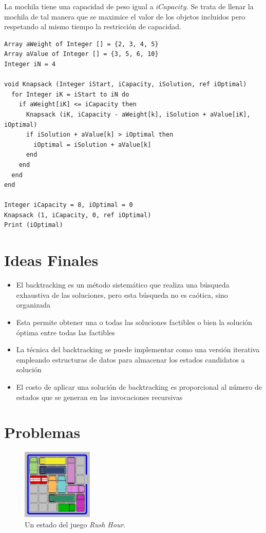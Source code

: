La mochila tiene una capacidad de peso igual a $iCapacity$. Se trata de llenar la mochila de tal manera que se maximice el valor de los objetos incluidos pero respetando al mismo tiempo la restricción de capacidad. 

\begin{lstlisting}[upquote=true, language=pseudo]
Array aWeight of Integer [] = {2, 3, 4, 5}
Array aValue of Integer [] = {3, 5, 6, 10}
Integer iN = 4

void Knapsack (Integer iStart, iCapacity, iSolution, ref iOptimal)
  for Integer iK = iStart to iN do
    if aWeight[iK] <= iCapacity then
      Knapsack (iK, iCapacity - aWeight[k], iSolution + aValue[iK], iOptimal)
      if iSolution + aValue[k] > iOptimal then
        iOptimal = iSolution + aValue[k]
      end
    end
  end
end

Integer iCapacity = 8, iOptimal = 0
Knapsack (1, iCapacity, 0, ref iOptimal)
Print (iOptimal)
\end{lstlisting}

\section{Ideas Finales}

\begin{itemize}
\item El backtracking es un método sistemático que realiza una búsqueda exhaustiva de las soluciones, pero esta búsqueda no es caótica, sino organizada
\item Esta permite obtener una o todas las soluciones factibles o bien la solución óptima entre todas las factibles
\item La técnica del backtracking se puede implementar como una versión iterativa empleando estructuras de datos para almacenar los estados candidatos a solución
\item El costo de aplicar una solución de backtracking es proporcional al número de estados que se generan en las invocaciones recursivas
\end{itemize}

\section{Problemas}
\begin{figure}[htp!]
  \begin{center}
    \includegraphics[width=0.3\textwidth]{images/rushhour.jpg}
  \end{center}
  \caption{Un estado del juego \textit{Rush Hour}.}
  \label{fig:Ch2rush}
\end{figure}


